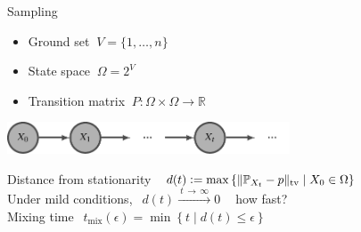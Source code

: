 \documentclass[mathserif]{beamer}
\begin{document}
\begin{frame}{Sampling}
\begin{itemize}
\item Ground set $\ V = \{1,\ldots,n\}$
\item State space $\ \Omega = 2^V$
\item Transition matrix $\ P : \Omega \times \Omega \to \mathbb{R}$
\end{itemize}

\begin{center}
\includegraphics[width=3.3in]{figures/markov.pdf}
\end{center}

\vspace{1em}
Distance from stationarity $\ \ d(t) \vcentcolon= \max \left\{\|\mathbb{P}_{X_t} - p\|_{\textrm{tv}} \mid X_0 \in \Omega\right\}$\\[1.5em]
Under mild conditions, $\ \ d(t) \xrightarrow{\ t\,\rightarrow\,\infty\ } 0\ \ \ \ $ {\color{col2} how fast?}\\[1.6em]
Mixing time $\ \ t_{\textrm{mix}}(\epsilon) = \min \left\{t \mid d(t) \leq \epsilon \right\}$
\end{frame}
\end{document}
